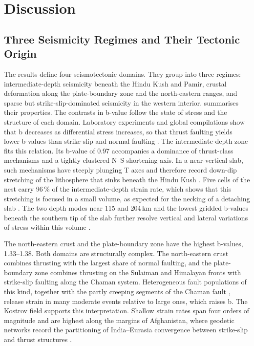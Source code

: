 \documentclass[11pt]{article}
\begin{document}
\section{Discussion}\label{sec:discussion}

\subsection{Three Seismicity Regimes and Their Tectonic Origin}
The results define four seismotectonic domains. They group into three regimes:
intermediate-depth seismicity beneath the Hindu Kush and Pamir, crustal deformation
along the plate-boundary zone and the north-eastern ranges, and sparse but
strike-slip-dominated seismicity in the western interior. 
summarises their properties.
The contrasts in b-value follow the state of stress and the structure of each
domain. Laboratory experiments and global compilations show that b decreases as
differential stress increases, so that thrust faulting yields lower b-values than
strike-slip and normal faulting \cite{Scholz1968, Schorlemmer2005, Scholz2015}. The
intermediate-depth zone fits this relation. Its b-value of 0.97 accompanies a
dominance of thrust-class mechanisms and a tightly clustered N--S shortening axis.
In a near-vertical slab, such mechanisms have steeply plunging T axes and therefore
record down-dip stretching of the lithosphere that sinks beneath the Hindu Kush
\cite{Zhan2016, Molnar2019, Kufner2017}. Five cells of the nest carry 96\,\% of the
intermediate-depth strain rate, which shows that this stretching is focused in a
small volume, as expected for the necking of a detaching slab \cite{Lister2008,
Kufner2016, Kufner2017}. The two depth modes near 115 and 204\,km and the lowest
gridded b-values beneath the southern tip of the slab further resolve vertical and
lateral variations of stress within this volume \cite{Pegler1998, Sippl2013}.

The north-eastern crust and the plate-boundary zone have the highest b-values,
1.33--1.38. Both domains are structurally complex. The north-eastern crust combines
thrusting with the largest share of normal faulting, and the plate-boundary zone
combines thrusting on the Sulaiman and Himalayan fronts with strike-slip faulting
along the Chaman system. Heterogeneous fault populations of this kind, together with
the partly creeping segments of the Chaman fault \cite{Fattahi2016, Barnhart2017,
Dalaison2021}, release strain in many moderate events relative to large ones, which
raises b. The Kostrov field supports this interpretation. Shallow strain rates span
four orders of magnitude and are highest along the margins of Afghanistan, where
geodetic networks record the partitioning of India--Eurasia convergence between
strike-slip and thrust structures \cite{Mohadjer2010, Szeliga2012}.
\end{document}
